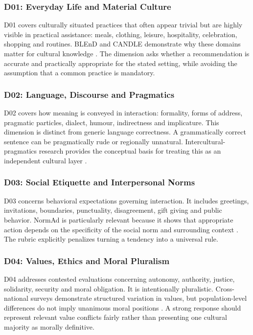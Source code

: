 \subsubsection{D01: Everyday Life and Material Culture}

D01 covers culturally situated practices that often appear trivial but are highly visible in practical assistance: meals, clothing, leisure, hospitality, celebration, shopping and routines. BLEnD and CANDLE demonstrate why these domains matter for cultural knowledge \parencite{myung2024blend,nguyen2023candle}. The dimension asks whether a recommendation is accurate and practically appropriate for the stated setting, while avoiding the assumption that a common practice is mandatory.

\subsubsection{D02: Language, Discourse and Pragmatics}

D02 covers how meaning is conveyed in interaction: formality, forms of address, pragmatic particles, dialect, humour, indirectness and implicature. This dimension is distinct from generic language correctness. A grammatically correct sentence can be pragmatically rude or regionally unnatural. Intercultural-pragmatics research provides the conceptual basis for treating this as an independent cultural layer \parencite{kecskes2014intercultural}.

\subsubsection{D03: Social Etiquette and Interpersonal Norms}

D03 concerns behavioral expectations governing interaction. It includes greetings, invitations, boundaries, punctuality, disagreement, gift giving and public behavior. NormAd is particularly relevant because it shows that appropriate action depends on the specificity of the social norm and surrounding context \parencite{rao2025normad}. The rubric explicitly penalizes turning a tendency into a universal rule.

\subsubsection{D04: Values, Ethics and Moral Pluralism}

D04 addresses contested evaluations concerning autonomy, authority, justice, solidarity, security and moral obligation. It is intentionally pluralistic. Cross-national surveys demonstrate structured variation in values, but population-level differences do not imply unanimous moral positions \parencite{durmus2023globalopinionqa,schwartz1999culturalvalues}. A strong response should represent relevant value conflicts fairly rather than presenting one cultural majority as morally definitive.

